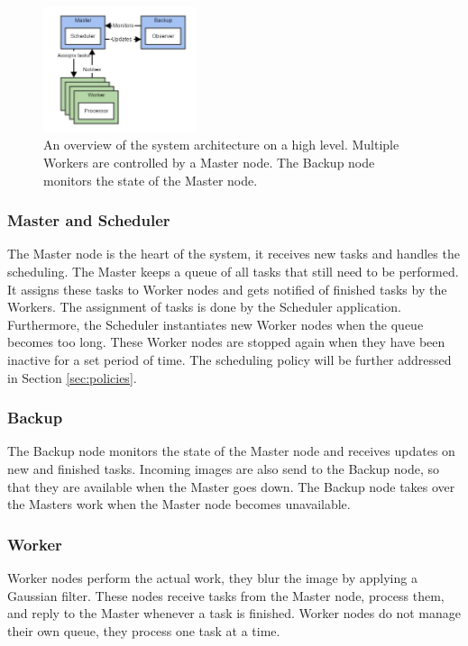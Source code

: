 \documentclass{acm_proc_article-sp}
\begin{document}
\begin{figure}
	\centering
	\includegraphics[width=0.4\textwidth]{images/architecture_overview.jpg}
	\caption{An overview of the system architecture on a high level. Multiple Workers are controlled by a Master node. The Backup node monitors the state of the Master node.}
	\label{fig:architecture_overview}
\end{figure}

\subsubsection{Master and Scheduler}
The Master node is the heart of the system, it receives new tasks and handles the scheduling.
The Master keeps a queue of all tasks that still need to be performed.
It assigns these tasks to Worker nodes and gets notified of finished tasks by the Workers.
The assignment of tasks is done by the Scheduler application.
Furthermore, the Scheduler instantiates new Worker nodes when the queue becomes too long.
These Worker nodes are stopped again when they have been inactive for a set period of time.
The scheduling policy will be further addressed in Section \ref{sec:policies}.

\subsubsection{Backup}
The Backup node monitors the state of the Master node and receives updates on new and finished tasks.
Incoming images are also send to the Backup node, so that they are available when the Master goes down.
The Backup node takes over the Masters work when the Master node becomes unavailable.

\subsubsection{Worker}
Worker nodes perform the actual work, they blur the image by applying a Gaussian filter.
These nodes receive tasks from the Master node, process them, and reply to the Master whenever a task is finished.
Worker nodes do not manage their own queue, they process one task at a time.
\end{document}
